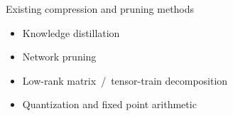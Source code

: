 \documentclass[handout]{beamer}
\begin{document}
\begin{frame}[c]{\insertsection}
  Existing compression and pruning methods
  \begin{itemize}
    \item Knowledge distillation\textsuperscript{
        \citep{hinton_distilling_2015,balasubramanian_deep_2016}}

    \smallskip
    \item Network pruning\textsuperscript{
        \citep{lecun_optimal_1990,seide_conversational_2011,zhu_prune_2018}}

    \smallskip
    \item Low-rank matrix~/~tensor-train decomposition\textsuperscript{
        \citep{denton_exploiting_2014,novikov_tensorizing_2015}}

    \smallskip
    \item Quantization and fixed point arithmetic\textsuperscript{
        \citep{courbariaux_training_2015,han_deep_2016,chen_fxpnet_2017,chen_compressing_2015}}
  \end{itemize}


\end{frame}
\end{document}
